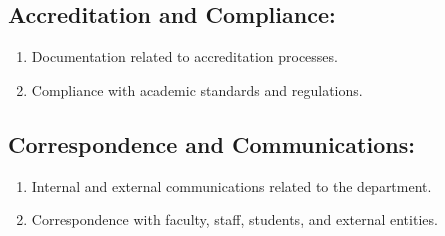 \documentclass[a4paper, 12pt]{article}
\begin{document}
\subsection*{Accreditation and Compliance:}
\begin{enumerate}
  \item Documentation related to accreditation processes.
  \item Compliance with academic standards and regulations.
\end{enumerate}

\subsection*{Correspondence and Communications:}
\begin{enumerate}
  \item Internal and external communications related to the department.
  \item Correspondence with faculty, staff, students, and external entities.
\end{enumerate}









%
%
\end{document}
